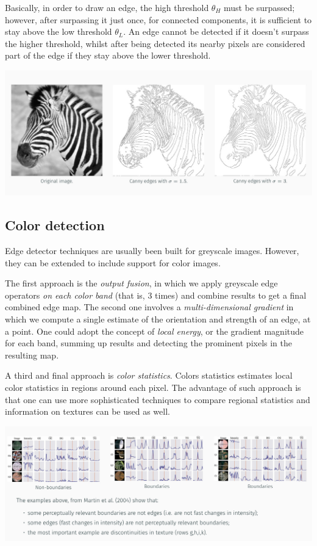 \documentclass[10pt]{report}
\begin{document}
Basically, in order to draw an edge, the high threshold \(\theta_H\)
must be surpassed; however, after surpassing it just once, for connected
components, it is sufficient to stay above the low threshold
\(\theta_L\). An edge cannot be detected if it doesn't surpass the
higher threshold, whilst after being detected its nearby pixels are
considered part of the edge if they stay above the lower threshold.

\begin{center}
\includegraphics[width=.9\linewidth]{./pics/det/canny-final-image.jpg}
\end{center}

\subsection{Color detection}
\label{color-detection}
Edge detector techniques are usually been built for greyscale images.
However, they can be extended to include support for color images.

The first approach is the \emph{output fusion}, in which we apply greyscale
edge operators \emph{on each color band} (that is, \(3\) times) and combine
results to get a final combined edge map. The second one involves a
\emph{multi-dimensional gradient} in which we compute a single estimate of
the orientation and strength of an edge, at a point. One could adopt the
concept of \emph{local energy}, or the gradient magnitude for each band,
summing up results and detecting the prominent pixels in the resulting
map.

A third and final approach is \emph{color statistics}. Colors statistics
estimates local color statistics in regions around each pixel. The
advantage of such approach is that one can use more sophisticated
techniques to compare regional statistics and information on textures
can be used as well.

\begin{center}
\includegraphics[width=.9\linewidth]{./pics/det/color-detection-textures.jpg}
\end{center}
\end{document}
